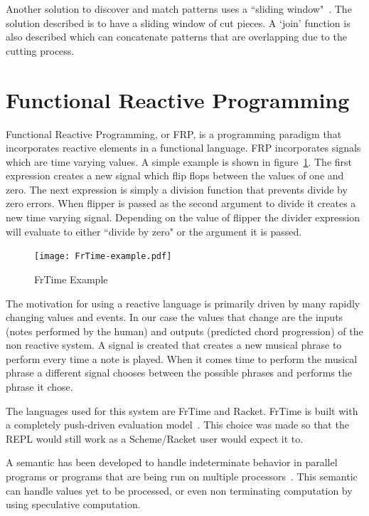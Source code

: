 \documentclass[12pt]{ucthesis}
\newcommand{\captionfonts}{\small\bf\ssp}
\begin{document}
Another solution to discover and match patterns uses a ``sliding window"~\cite{slidingWindow}. The solution described is to have a sliding window of cut pieces. A `join' function is also described which can concatenate patterns that are overlapping due to the cutting process.



\section{Functional Reactive Programming}
\label{rw:frp}


Functional Reactive Programming, or FRP, is a programming paradigm that incorporates reactive elements in a functional language. FRP incorporates signals which are time varying values. A simple example is shown in figure~\ref{fig:FrTime-example}. The first expression creates a new signal which flip flops between the values of one and zero. The next expression is simply a division function that prevents divide by zero errors. When flipper is passed as the second argument to divide it creates a new time varying signal. Depending on the value of flipper the divider expression will evaluate to either ``divide by zero" or the argument it is passed.

\begin{figure}
\texttt{[image: FrTime-example.pdf]}
\captionfonts
\caption[FrTime Example]{FrTime Example}
\label{fig:FrTime-example}
\end{figure}

The motivation for using a reactive language is primarily driven by many rapidly changing values and events. In our case the values that change are the inputs (notes performed by the human) and outputs (predicted chord progression) of the non reactive system. A signal is created that creates a new musical phrase to perform every time a note is played. When it comes time to perform the musical phrase a different signal chooses between the possible phrases and performs the phrase it chose.

The languages used for this system are FrTime and Racket. FrTime is built with a completely push-driven evaluation model~\cite{FrTime}. This choice was made so that the REPL would still work as a Scheme/Racket user would expect it to.

A semantic has been developed to handle indeterminate behavior in parallel programs or programs that are being run on multiple processors~\cite{historic-paper}. This semantic can handle values yet to be processed, or even non terminating computation by using speculative computation. 
\end{document}
